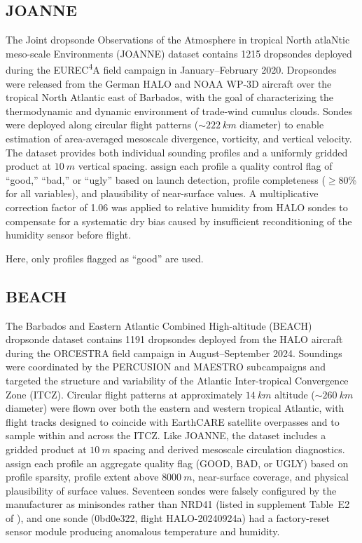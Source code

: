 \documentclass[11pt]{article}
\begin{document}
\subsection{JOANNE}

The Joint dropsonde Observations of the Atmosphere in tropical North atlaNtic meso-scale Environments (JOANNE) dataset \citep{george2021} contains 1215 dropsondes deployed during the EUREC\textsuperscript{4}A field campaign in January--February 2020.  Dropsondes were released from the German HALO and NOAA WP-3D aircraft over the tropical North Atlantic east of Barbados, with the goal of characterizing the thermodynamic and dynamic environment of trade-wind cumulus clouds.  Sondes were deployed along circular flight patterns (${\sim}\SI{222}{km}$ diameter) to enable estimation of area-averaged mesoscale divergence, vorticity, and vertical velocity.  The dataset provides both individual sounding profiles and a uniformly gridded product at $\SI{10}{m}$ vertical spacing.  \citet{george2021} assign each profile a quality control flag of ``good,'' ``bad,'' or ``ugly'' based on launch detection, profile completeness ($\geq$80\% for all variables), and plausibility of near-surface values.  A multiplicative correction factor of 1.06 was applied to relative humidity from HALO sondes to compensate for a systematic dry bias caused by insufficient reconditioning of the humidity sensor before flight.

Here, only profiles flagged as ``good'' are used.

\subsection{BEACH}

The Barbados and Eastern Atlantic Combined High-altitude (BEACH) dropsonde dataset \citep{gloeckner2025} contains 1191 dropsondes deployed from the HALO aircraft during the ORCESTRA field campaign in August--September 2024.  Soundings were coordinated by the PERCUSION and MAESTRO subcampaigns and targeted the structure and variability of the Atlantic Inter-tropical Convergence Zone (ITCZ).  Circular flight patterns at approximately $\SI{14}{km}$ altitude (${\sim}\SI{260}{km}$ diameter) were flown over both the eastern and western tropical Atlantic, with flight tracks designed to coincide with EarthCARE satellite overpasses and to sample within and across the ITCZ.  Like JOANNE, the dataset includes a gridded product at $\SI{10}{m}$ spacing and derived mesoscale circulation diagnostics.  \citet{gloeckner2025} assign each profile an aggregate quality flag (GOOD, BAD, or UGLY) based on profile sparsity, profile extent above $\SI{8000}{m}$, near-surface coverage, and physical plausibility of surface values.  Seventeen sondes were falsely configured by the manufacturer as minisondes rather than NRD41 (listed in supplement Table~E2 of \citealt{gloeckner2025}), and one sonde (0bd0e322, flight HALO-20240924a) had a factory-reset sensor module producing anomalous temperature and humidity.
\end{document}
